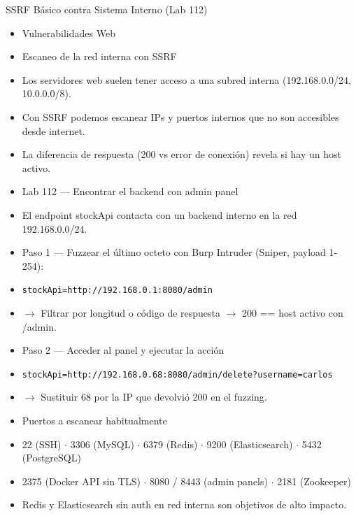 \documentclass[aspectratio=169,10pt]{beamer}
\newcommand{\cmd}[1]{\texttt{\color{uznavy}#1}}
\begin{document}
\begin{frame}[allowframebreaks]{SSRF Básico contra Sistema Interno (Lab 112)}
\small
  \begin{itemize}
  \item Vulnerabilidades Web
  \item Escaneo de la red interna con SSRF
  \item Los servidores web suelen tener acceso a una subred interna (192.168.0.0/24, 10.0.0.0/8).
  \item Con SSRF podemos escanear IPs y puertos internos que no son accesibles desde internet.
  \item La diferencia de respuesta (200 vs error de conexión) revela si hay un host activo.
  \item Lab 112 --- Encontrar el backend con admin panel
  \item El endpoint stockApi contacta con un backend interno en la red 192.168.0.0/24.
  \item Paso 1 --- Fuzzear el último octeto con Burp Intruder (Sniper, payload 1-254):
  \item \cmd{stockApi=http://192.168.0.1:8080/admin}
  \item $\rightarrow$ Filtrar por longitud o código de respuesta $\rightarrow$ 200 == host activo con /admin.
  \item Paso 2 --- Acceder al panel y ejecutar la acción
  \item \cmd{stockApi=http://192.168.0.68:8080/admin/delete?username=carlos}
  \item $\rightarrow$ Sustituir 68 por la IP que devolvió 200 en el fuzzing.
  \item Puertos a escanear habitualmente
  \item 22 (SSH) $\cdot$ 3306 (MySQL) $\cdot$ 6379 (Redis) $\cdot$ 9200 (Elasticsearch) $\cdot$ 5432 (PostgreSQL)
  \item 2375 (Docker API sin TLS) $\cdot$ 8080 / 8443 (admin panels) $\cdot$ 2181 (Zookeeper)
  \item Redis y Elasticsearch sin auth en red interna son objetivos de alto impacto.
  \end{itemize}
\end{frame}
\end{document}
